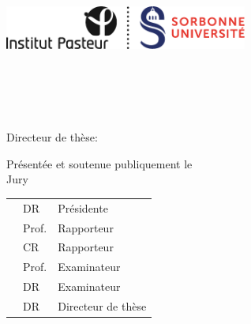 %
%

\begin{titlepage}
	\thispagestyle{fancytitlepage}
	\tgherosfont
	\centering

	{\Huge \thesisUniversity} \\[2mm]
    {\Large \thesisUniversityDepartment} \\[2mm]
	\includegraphics[width=8cm]{FrontBackMatter/gfx/UPMC_Sorbonne_Universites_Logo} \\[2mm]	
	\textsf{\large \thesisUniversityGroup} \\
    \textsf{\large \thesisUniversityInstitute} \\

	\vfill
	{\large \thesisSubject} \\[10mm]
	{\LARGE \color{ctcolortitle}\textbf{\thesisTitle} \\[10mm]}
	{\Large \thesisName} \\[5mm]
    {\Large Directeur de thèse: \textbf{\thesisFirstSupervisor}}\\
    \vfill
    
    {\large Présentée et soutenue publiquement le \thesisDate }\\[5mm]
    {\large Jury}\\
	\begin{tabular}{>{\Large\bfseries}l>{\Large}l>{\Large}l}
		\thesisPresident & DR & Présidente\\
		\thesisFirstReviewer & Prof. & Rapporteur\\
		\thesisSecondReviewer & CR & Rapporteur\\
		\thesisFirstExaminer & Prof. & Examinateur\\
		\thesisSecondExaminer & DR & Examinateur\\
		\thesisFirstSupervisor & DR & Directeur de thèse\\
	\end{tabular}
\end{titlepage}


